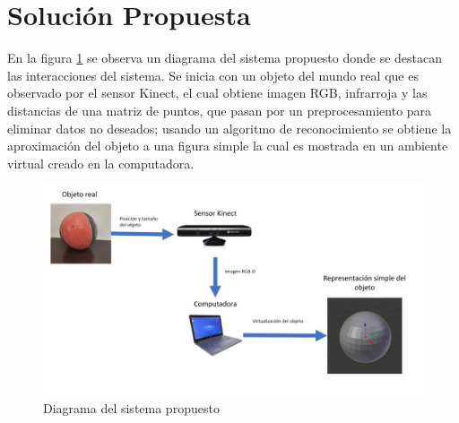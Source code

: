 \section{Solución Propuesta}

    En la figura \ref{fig:Diagrama} se observa un diagrama del \gls{sistema} propuesto donde se destacan las interacciones del sistema. Se inicia con un objeto del mundo real que es observado por el sensor Kinect, el cual obtiene imagen RGB, infrarroja y las distancias de una matriz de puntos, que pasan por un preprocesamiento para eliminar datos no deseados; usando un algoritmo de reconocimiento se obtiene la aproximación del objeto a una figura simple la cual es mostrada en un ambiente virtual creado en la computadora.\\
    
    
    \begin{figure}[!htb] 
        \centering
        \includegraphics[width=\textwidth]{01Introduccion/imagenes/Diagrama_del_sistema.jpg}
        \caption{Diagrama del sistema propuesto} 
        \label{fig:Diagrama}
    \end{figure} 
